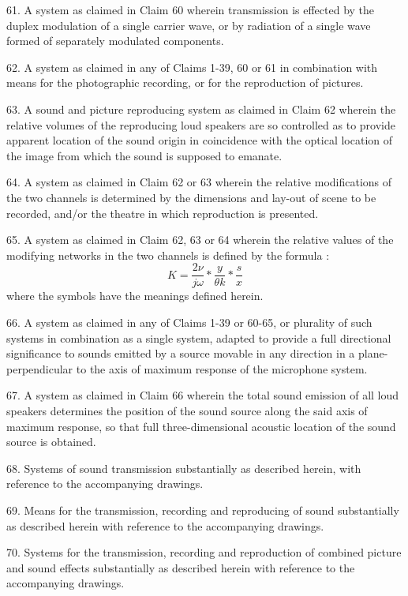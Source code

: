 \documentclass[11pt]{article}
\begin{document}
\begin{multicols*}{2}
61. A system as claimed in Claim 60 wherein transmission is effected by the duplex modulation of a single carrier wave, or by radiation of a single wave formed of separately modulated components.

62. A system as claimed in any of Claims 1-39, 60 or 61 in combination with means for the photographic recording, or for the reproduction of pictures. 

63. A sound and picture reproducing system as claimed in Claim 62 wherein the relative volumes of the reproducing loud speakers are so controlled as to provide apparent location of the sound origin in coincidence with the optical location of the image from which the sound is supposed to emanate.

64. A system as claimed in Claim 62 or 63 wherein the relative modifications of the two channels is determined by the dimensions and lay-out of scene to be recorded, and/or the theatre in which reproduction is presented.

65. A system as claimed in Claim 62, 63 or 64 wherein the relative values of the modifying networks in the two channels is defined by the formula :
\[
K = \frac{2\nu}{j\omega} * \frac{y}{\theta k} * \frac{s}{x}
\]
where the symbols have the meanings defined herein. 

66. A system as claimed in any of Claims 1-39 or 60-65, or plurality of such systems in combination as a single system, adapted to provide a full directional significance to sounds emitted by a source movable in any direction in a plane-perpendicular to the axis of maximum response of the microphone system.

67. A system as claimed in Claim 66 wherein the total sound emission of all loud speakers determines the position of the sound source along the said axis of maximum response, so that full three-dimensional acoustic location of the sound source is obtained. 

68. Systems of sound transmission substantially as described herein, with reference to the accompanying drawings. 

69. Means for the transmission, recording and reproducing of sound substantially as described herein with reference to the accompanying drawings. 

70. Systems for the transmission, recording and reproduction of combined picture and sound effects substantially as described herein with reference to the accompanying drawings. 

\begin{flushright}


\end{flushright}
\end{multicols*}
\end{document}
